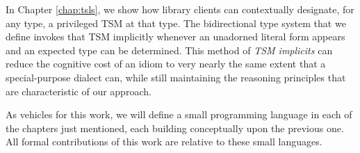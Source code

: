 In Chapter \ref{chap:tsls}, we show how library clients can contextually designate, for any type, a privileged TSM at that type. The bidirectional type system that we define  invokes that TSM implicitly whenever an unadorned literal form appears and an expected type can be determined. This method of \emph{TSM implicits} can reduce the cognitive cost of an idiom to very nearly the same extent that a special-purpose dialect can, while still maintaining the reasoning principles that are characteristic of our approach.


As vehicles for this work, we will define a small programming language in each of the chapters just mentioned, each building conceptually upon the previous one. All formal contributions of this work are relative to these small languages.


